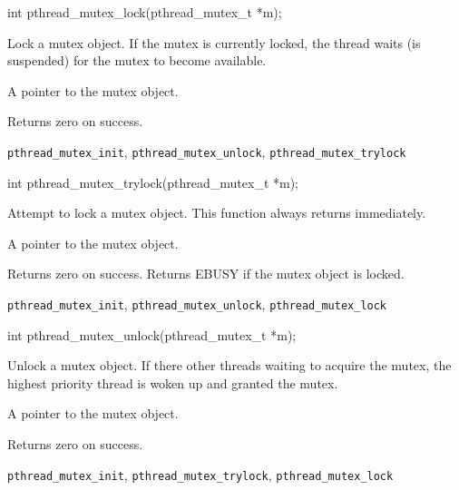 \begin{apisyn}

	\funcproto int pthread_mutex_lock(pthread_mutex_t *m);
\end{apisyn}
\begin{apidesc}
	Lock a mutex object. If the mutex is currently locked, the thread
	waits (is suspended) for the mutex to become available.
\end{apidesc}
\begin{apiparm}
	\item[mutex]
		A pointer to the mutex object.
\end{apiparm}
\begin{apiret}
	Returns zero on success.
\end{apiret}
\begin{apirel}
	{\tt pthread_mutex_init}, {\tt pthread_mutex_unlock},
	{\tt pthread_mutex_trylock}
\end{apirel}


\begin{apisyn}

	\funcproto int pthread_mutex_trylock(pthread_mutex_t *m);
\end{apisyn}
\begin{apidesc}
	Attempt to lock a mutex object. This function always returns
	immediately.
\end{apidesc}
\begin{apiparm}
	\item[mutex]
		A pointer to the mutex object.
\end{apiparm}
\begin{apiret}
	Returns zero on success. Returns EBUSY if the mutex object is
	locked. 
\end{apiret}
\begin{apirel}
	{\tt pthread_mutex_init}, {\tt pthread_mutex_unlock},
	{\tt pthread_mutex_lock}
\end{apirel}


\begin{apisyn}

	\funcproto int pthread_mutex_unlock(pthread_mutex_t *m);
\end{apisyn}
\begin{apidesc}
	Unlock a mutex object. If there other threads waiting to acquire
	the mutex, the highest priority thread is woken up and granted the
	mutex. 
\end{apidesc}
\begin{apiparm}
	\item[mutex]
		A pointer to the mutex object.
\end{apiparm}
\begin{apiret}
	Returns zero on success.
\end{apiret}
\begin{apirel}
	{\tt pthread_mutex_init}, {\tt pthread_mutex_trylock},
	{\tt pthread_mutex_lock}
\end{apirel}


